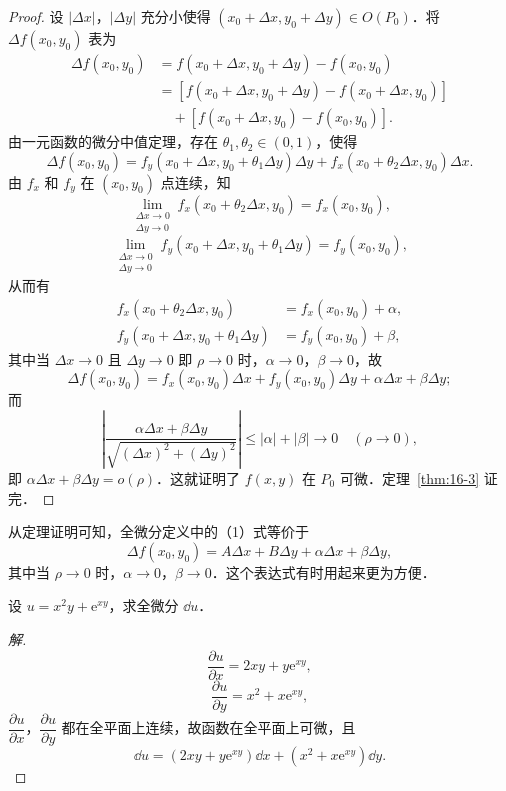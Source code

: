 \begin{proof}
设 $\left|\Delta x\right|$，$\left|\Delta y\right|$ 充分小使得 $(x_{0}+\Delta x,y_{0}+\Delta y)\in O(P_{0})$．将 $\Delta f(x_{0},y_{0})$ 表为
\[
\begin{aligned}
\Delta f(x_{0},y_{0})&=f(x_{0}+\Delta x,y_{0}+\Delta y)-f(x_{0},y_{0})\\
&=\left[f(x_{0}+\Delta x,y_{0}+\Delta y)-f(x_{0}+\Delta x,y_{0})\right]\\
&\quad+\left[f(x_{0}+\Delta x,y_{0})-f(x_{0},y_{0})\right].
\end{aligned}
\]
由一元函数的微分中值定理，存在 $\theta_{1},\theta_{2}\in(0,1)$，使得
\[
\Delta f(x_{0},y_{0})=f_{y}(x_{0}+\Delta x,y_{0}+\theta_{1}\Delta y)\Delta y+f_{x}(x_{0}+\theta_{2}\Delta x,y_{0})\Delta x.
\]
由 $f_{x}$ 和 $f_{y}$ 在 $(x_{0},y_{0})$ 点连续，知
\[
\lim_{\substack{\Delta x\to 0\\ \Delta y\to 0}}f_{x}(x_{0}+\theta_{2}\Delta x,y_{0})=f_{x}(x_{0},y_{0}),
\]
\[
\lim_{\substack{\Delta x\to 0\\ \Delta y\to 0}}f_{y}(x_{0}+\Delta x,y_{0}+\theta_{1}\Delta y)=f_{y}(x_{0},y_{0}),
\]
从而有
\[
\begin{aligned}
f_{x}(x_{0}+\theta_{2}\Delta x,y_{0})&=f_{x}(x_{0},y_{0})+\alpha,\\
f_{y}(x_{0}+\Delta x,y_{0}+\theta_{1}\Delta y)&=f_{y}(x_{0},y_{0})+\beta,
\end{aligned}
\]
其中当 $\Delta x\to 0$ 且 $\Delta y\to 0$ 即 $\rho\to 0$ 时，$\alpha\to 0$，$\beta\to 0$，故
\[
\Delta f(x_{0},y_{0})=f_{x}(x_{0},y_{0})\Delta x+f_{y}(x_{0},y_{0})\Delta y+\alpha\Delta x+\beta\Delta y;
\]
而
\[
\left|\frac{\alpha\Delta x+\beta\Delta y}{\sqrt{(\Delta x)^{2}+(\Delta y)^{2}}}\right|\leqslant\left|\alpha\right|+\left|\beta\right|\to 0\quad(\rho\to 0),
\]
即 $\alpha\Delta x+\beta\Delta y=o(\rho)$．这就证明了 $f(x,y)$ 在 $P_{0}$ 可微．定理~\ref{thm:16-3} 证完．
\end{proof}

从定理证明可知，全微分定义中的（1）式等价于
\[
\Delta f(x_{0},y_{0})=A\Delta x+B\Delta y+\alpha\Delta x+\beta\Delta y,
\]
其中当 $\rho\to 0$ 时，$\alpha\to 0$，$\beta\to 0$．这个表达式有时用起来更为方便．

\begin{example}\label{ex:16-1-4}
设 $u=x^{2}y+\mathrm{e}^{xy}$，求全微分 $\dd u$．
\end{example}

\begin{proof}[解]
\[
\frac{\partial u}{\partial x}=2xy+y\mathrm{e}^{xy},
\]
\[
\frac{\partial u}{\partial y}=x^{2}+x\mathrm{e}^{xy},
\]
$\dfrac{\partial u}{\partial x}$，$\dfrac{\partial u}{\partial y}$ 都在全平面上连续，故函数在全平面上可微，且
\[
\dd u=(2xy+y\mathrm{e}^{xy})\dd x+(x^{2}+x\mathrm{e}^{xy})\dd y.
\]
\end{proof}

